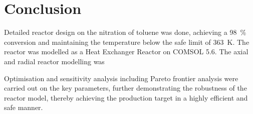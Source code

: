\section{Conclusion} \label{sec:conclusion}
Detailed reactor design on the nitration of toluene was done, achieving a \SI{98}{\%} conversion and maintaining the temperature below the safe limit of \SI{363}{\K}. The reactor was modelled as a Heat Exchanger Reactor on COMSOL 5.6.   
The axial and radial reactor modelling was 

Optimisation and sensitivity analysis including Pareto frontier analysis were carried out on the key parameters, further demonstrating the robustness of the reactor model, thereby achieving the production target in a highly efficient and safe manner.  